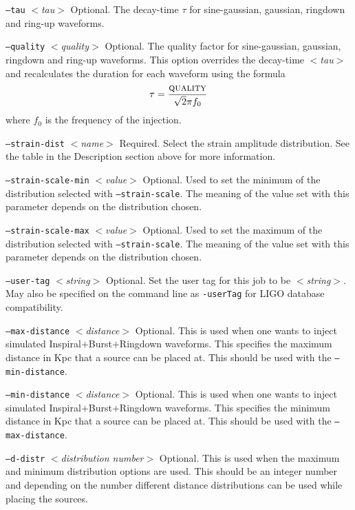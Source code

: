 \documentclass{article}
\newcommand{\option}[1]{\texttt{#1}}
\newcommand{\parm}[1]{$<$\textit{#1}$>$}
\newenvironment{entry}%
  {\begin{list}{}{\renewcommand{\makelabel}[1]%
    {\parbox[b]{\labelwidth}{\makebox[0pt][l]{\textbf{##1}}\\}}%
    \setlength{\labelwidth}{1em}%
    \setlength{\labelsep}{1em}%
    \setlength{\leftmargin}{2em}%
    \setlength{\topsep}{\medskipamount}%
    \setlength{\itemsep}{\medskipamount}%
    \setlength{\parsep}{\medskipamount}%
    \setlength{\listparindent}{0pt}}}
  {\end{list}}
\begin{document}
\begin{entry}
\begin{entry}
\item[\option{--tau} \parm{tau}]
Optional.  The decay-time $\tau$ for sine-gaussian,  gaussian,  ringdown
and ring-up waveforms.

\item[\option{--quality} \parm{quality}]
Optional.  The quality factor for sine-gaussian,  gaussian,  ringdown and
ring-up waveforms.    This option overrides the decay-time \parm{tau} and
recalculates the duration for each waveform using the formula
$$ 
\tau = \frac{\textsc{quality} }{ \sqrt{2} \pi f_0 }
$$
where $f_0$ is the frequency of the injection.

\item[\option{--strain-dist} \parm{name}]
Required.  Select the strain amplitude distribution.  See the table in the
Description section above for more information.

\item[\option{--strain-scale-min} \parm{value}]
Optional.  Used to set the minimum of the distribution selected with
\option{--strain-scale}.  The meaning of the value set with this parameter
depends on the distribution chosen.

\item[\option{--strain-scale-max} \parm{value}]
Optional.  Used to set the maximum of the distribution selected with
\option{--strain-scale}.  The meaning of the value set with this parameter
depends on the distribution chosen.

\item[\option{--user-tag} \parm{string}]
Optional. Set the user tag for this job to be \parm{string}. May also be
specified on the command line as \option{-userTag} for LIGO database
compatibility.

\item[\option{--max-distance} \parm{distance}]
Optional.  This is used when one wants to inject simulated Inspiral$+$Burst$+$Ringdown 
waveforms.  This specifies the maximum distance in Kpc that a source can be placed at.
This should be used with the \option{--min-distance}.

\item[\option{--min-distance} \parm{distance}]
Optional.  This is used when one wants to inject simulated Inspiral$+$Burst$+$Ringdown 
waveforms.  This specifies the minimum distance in Kpc that a source can be placed at.
This should be used with the \option{--max-distance}.

\item[\option{--d-distr} \parm{distribution number}] 
Optional.  This is used when the maximum and minimum distribution options are used.
 This should be an integer number and depending on the number different distance
distributions can be used while placing the sources.  


\end{entry}
\end{entry}
\end{document}
